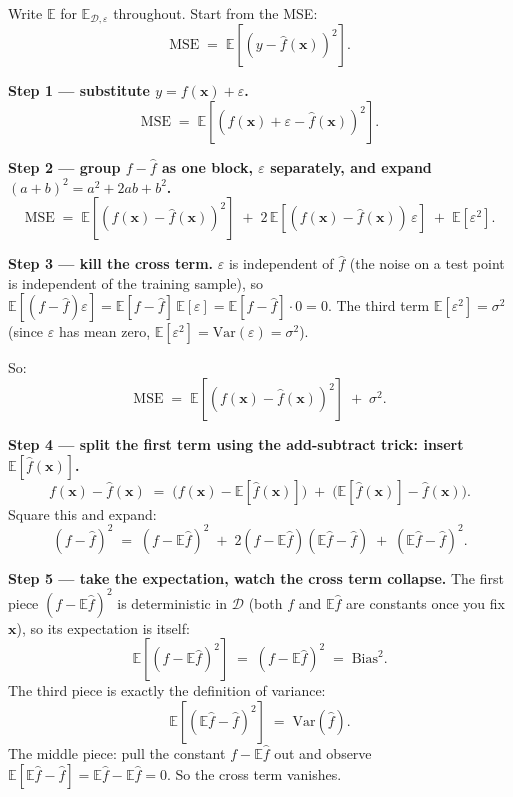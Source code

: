 \documentclass[11pt, a4paper]{article}
\begin{document}
Write $\mathbb{E}$ for $\mathbb{E}_{\mathcal{D},\varepsilon}$ throughout. Start from the MSE:
\[
\text{MSE} \;=\; \mathbb{E}\!\left[(y - \hat f(\mathbf{x}))^2\right].
\]

\textbf{Step 1 — substitute $y = f(\mathbf{x}) + \varepsilon$.}
\[
\text{MSE} \;=\; \mathbb{E}\!\left[(f(\mathbf{x}) + \varepsilon - \hat f(\mathbf{x}))^2\right].
\]

\textbf{Step 2 — group $f - \hat f$ as one block, $\varepsilon$ separately, and expand $(a + b)^2 = a^2 + 2ab + b^2$.}
\[
\text{MSE} \;=\; \mathbb{E}\!\left[(f(\mathbf{x}) - \hat f(\mathbf{x}))^2\right] \;+\; 2\,\mathbb{E}\!\left[(f(\mathbf{x}) - \hat f(\mathbf{x}))\,\varepsilon\right] \;+\; \mathbb{E}[\varepsilon^2].
\]

\textbf{Step 3 — kill the cross term.} $\varepsilon$ is independent of $\hat{f}$ (the noise on a test point is independent of the training sample), so $\mathbb{E}[(f - \hat f)\varepsilon] = \mathbb{E}[f - \hat f]\,\mathbb{E}[\varepsilon] = \mathbb{E}[f - \hat f] \cdot 0 = 0$. The third term $\mathbb{E}[\varepsilon^2] = \sigma^2$ (since $\varepsilon$ has mean zero, $\mathbb{E}[\varepsilon^2] = \mathrm{Var}(\varepsilon) = \sigma^2$).

So:
\[
\text{MSE} \;=\; \mathbb{E}\!\left[(f(\mathbf{x}) - \hat f(\mathbf{x}))^2\right] \;+\; \sigma^2.
\]

\textbf{Step 4 — split the first term using the add-subtract trick: insert $\mathbb{E}[\hat{f}(\mathbf{x})]$.}
\[
f(\mathbf{x}) - \hat f(\mathbf{x}) \;=\; \bigl(f(\mathbf{x}) - \mathbb{E}[\hat f(\mathbf{x})]\bigr) \;+\; \bigl(\mathbb{E}[\hat f(\mathbf{x})] - \hat f(\mathbf{x})\bigr).
\]
Square this and expand:
\[
(f - \hat f)^2 \;=\; (f - \mathbb{E}\hat f)^2 \;+\; 2(f - \mathbb{E}\hat f)(\mathbb{E}\hat f - \hat f) \;+\; (\mathbb{E}\hat f - \hat f)^2.
\]

\textbf{Step 5 — take the expectation, watch the cross term collapse.} The first piece $(f - \mathbb{E}\hat f)^2$ is deterministic in $\mathcal{D}$ (both $f$ and $\mathbb{E}\hat{f}$ are constants once you fix $\mathbf{x}$), so its expectation is itself:
\[
\mathbb{E}[(f - \mathbb{E}\hat f)^2] \;=\; (f - \mathbb{E}\hat f)^2 \;=\; \text{Bias}^2.
\]
The third piece is exactly the definition of variance:
\[
\mathbb{E}[(\mathbb{E}\hat f - \hat f)^2] \;=\; \mathrm{Var}(\hat f).
\]
The middle piece: pull the constant $f - \mathbb{E}\hat f$ out and observe $\mathbb{E}[\mathbb{E}\hat f - \hat f] = \mathbb{E}\hat f - \mathbb{E}\hat f = 0$. So the cross term vanishes.
\end{document}

